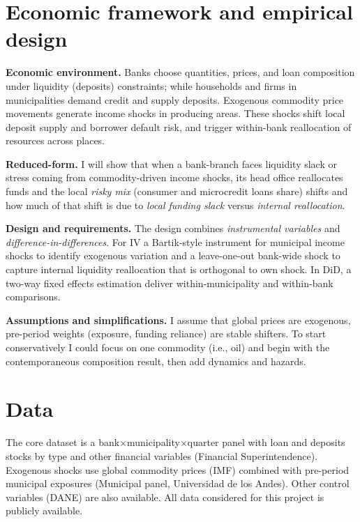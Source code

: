 \section{ Economic framework and empirical design} \label{section:efed} 

\noindent \textbf{Economic environment.} Banks choose quantities, prices, and loan composition under liquidity (deposits) constraints;  while households and firms in municipalities demand credit and supply deposits. Exogenous commodity price movements generate income shocks in producing areas. These shocks shift local deposit supply and borrower default risk, and trigger within-bank reallocation of resources across places.

\noindent \textbf{Reduced-form.} I will show that when a bank-branch faces liquidity slack or stress coming from commodity-driven income shocks, its head office reallocates funds and the local \textit{risky mix} (consumer and microcredit loans share) shifts and how much of that shift is due to \textit{local funding slack} versus \textit{internal reallocation}.
 
\noindent \textbf{Design and requirements.} The design combines \emph{instrumental variables} and \emph{difference-in-differences}. For IV a Bartik-style instrument for municipal income shocks to identify exogenous variation and a leave-one-out bank-wide shock to capture internal liquidity reallocation that is orthogonal to own shock. In DiD, a two-way fixed effects estimation deliver within-municipality and within-bank comparisons.

\noindent \textbf{Assumptions and simplifications.} I assume that global prices are exogenous, pre-period weights (exposure, funding reliance) are stable shifters. To start conservatively I could focus on one commodity (i.e., oil) and begin with the contemporaneous composition result, then add dynamics and hazards.


\section{ Data} \label{section:data} 

\noindent The core dataset is a bank$\times$municipality$\times$quarter panel with loan and deposits stocks by type and other financial variables (Financial Superintendence). Exogenous shocks use global commodity prices (IMF) combined with pre-period municipal exposures (Municipal panel, Universidad de los Andes). Other control variables (DANE) are also available. All data considered for this project is publicly available.


\singlespacing

%

\pagebreak
\renewcommand*{\thepage}{A.\arabic{page}}
\setcounter{page}{0}
\setcounter{equation}{0}
\renewcommand{\theequation}{A.\arabic{equation}}
\setcounter{section}{0}
\renewcommand{\thesection}{A.\arabic{section}}
\renewcommand{\thefigure}{A.\arabic{figure}}
\setcounter{figure}{0}
\renewcommand{\thetable}{A.\arabic{table}}
\setcounter{table}{0}
\thispagestyle{empty}


